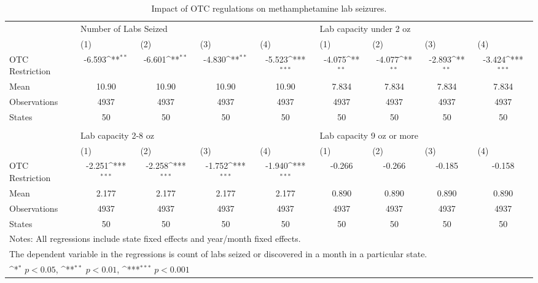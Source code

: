 \documentclass[
  11pt,
]{article}
\begin{document}
\begin{table}[!htbp]\centering
\def\sym#1{\ifmmode^{#1}\else\(^{#1}\)\fi}
\caption{Impact of OTC regulations on methamphetamine lab seizures.}
\begin{tabular}{l*{8}{c}}
\toprule
\multicolumn{1}{l}{ } & \multicolumn{4}{l}{Number of Labs Seized } & \multicolumn{4}{l}{ Lab capacity under 2 oz \label{fe-results}}\\ \cmidrule(l{3pt}r{3pt}){2-5} \cmidrule(l{3pt}r{3pt}){6-9}
 &\multicolumn{1}{l}{(1)}&\multicolumn{1}{l}{(2)}&\multicolumn{1}{l}{(3)}&\multicolumn{1}{l}{(4)}&\multicolumn{1}{l}{(1)}&\multicolumn{1}{l}{(2)}&\multicolumn{1}{l}{(3)}&\multicolumn{1}{l}{(4)}\\
\midrule
OTC Restriction& -6.593\sym{**} & -6.601\sym{**} & -4.830\sym{**} & -5.523\sym{***}& -4.075\sym{**} & -4.077\sym{**} & -2.893\sym{**} & -3.424\sym{***}\\
\midrule
Mean & 10.90 & 10.90 & 10.90 & 10.90 & 7.834 & 7.834 & 7.834 & 7.834 \\
Observations& 4937 & 4937 & 4937 & 4937 & 4937 & 4937 & 4937 & 4937 \\
States & 50 & 50 & 50 & 50 & 50 & 50 & 50 & 50 \\
\toprule
\vspace{0.5cm}\\
\multicolumn{1}{l}{ } & \multicolumn{4}{l}{Lab capacity 2-8 oz } & \multicolumn{4}{l}{ Lab capacity 9 oz or more }\\ \cmidrule(l{3pt}r{3pt}){2-5} \cmidrule(l{3pt}r{3pt}){6-9}
 &\multicolumn{1}{l}{(1)}&\multicolumn{1}{l}{(2)}&\multicolumn{1}{l}{(3)}&\multicolumn{1}{l}{(4)}&\multicolumn{1}{l}{(1)}&\multicolumn{1}{l}{(2)}&\multicolumn{1}{l}{(3)}&\multicolumn{1}{l}{(4)}\\
\midrule
OTC Restriction& -2.251\sym{***}& -2.258\sym{***}& -1.752\sym{***}& -1.940\sym{***}& -0.266 & -0.266 & -0.185 & -0.158 \\
\midrule
Mean & 2.177 & 2.177 & 2.177 & 2.177 & 0.890 & 0.890 & 0.890 & 0.890 \\
Observations& 4937 & 4937 & 4937 & 4937 & 4937 & 4937 & 4937 & 4937 \\
States & 50 & 50 & 50 & 50 & 50 & 50 & 50 & 50 \\
\midrule\midrule
\multicolumn{9}{l}{\footnotesize Notes: All regressions include state fixed effects and year/month fixed effects.}\\
\multicolumn{9}{l}{\footnotesize The dependent variable in the regressions is count of labs seized or discovered in a month in a particular state.}\\
\multicolumn{9}{l}{\footnotesize \sym{*} \(p<0.05\), \sym{**} \(p<0.01\), \sym{***} \(p<0.001\)}\\
\end{tabular}
\end{table}
\end{document}
